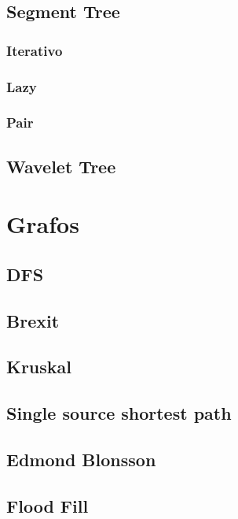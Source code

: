 \documentclass[oneside]{book}
\begin{document}
	\section{Segment Tree}
		\subsection{Iterativo}
			
		\subsection{Lazy}
			
		\subsection{Pair}
			
			
			
	\section{Wavelet Tree}
		
		
			

	
	\chapter{Grafos}
	\section{DFS}
	
	\section{Brexit}
	
	\section{Kruskal}
	
	\section{Single source shortest path}
	\section{Edmond Blonsson}
	
	\section{Flood Fill}
	
\end{document}
